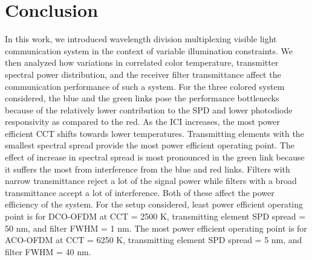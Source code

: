\section{Conclusion}\label{sec:conclusion}
In this work, we introduced wavelength division multiplexing visible light communication system in the context of variable illumination constraints. We then analyzed how variations in correlated color temperature, transmitter spectral power distribution, and the receiver filter transmittance affect the communication performance of such a system. For the three colored system considered, the blue and the green links pose the performance bottlenecks because of the relatively lower contribution to the SPD and lower photodiode responsivity as compared to the red. As the ICI increases, the most power efficient CCT shifts towards lower temperatures. Transmitting elements with the smallest spectral spread provide the most power efficient operating point. The effect of increase in spectral spread is most pronounced in the green link because it suffers the most from interference from the blue and red links. Filters with narrow transmittance reject a lot of the signal power while filters with a broad transmittance accept a lot of interference. Both of these affect the power efficiency of the system. For the setup considered, least power efficient operating point is for DCO-OFDM at CCT = 2500 K, transmitting element SPD spread = 50 nm, and filter FWHM = 1 nm. The most power efficient operating point is for ACO-OFDM at CCT = 6250 K, transmitting element SPD spread = 5 nm, and filter FWHM = 40 nm.